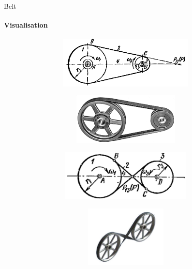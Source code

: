 \documentclass[aspectratio=169]{beamer}
\begin{document}
\begin{frame}[t]{Belt}
    \framesubtitle{Visualisation}
    \vspace{-0.5cm}
    \begin{figure}[H]
        \begin{subfigure}{0.49\textwidth}
            \centering\includegraphics[height=2.6cm,width=1\textwidth,keepaspectratio]{belt_kinematics_1.png}
            \label{fig:belt_kinematics_1.png}
        \end{subfigure}
        \begin{subfigure}{0.49\textwidth}
            \centering\includegraphics[height=2.6cm,width=1\textwidth,keepaspectratio]{belt_1.png}
            \label{fig:belt_1.png}
        \end{subfigure}

        \begin{subfigure}{0.49\textwidth}
            \centering\includegraphics[height=2.6cm,width=1\textwidth,keepaspectratio]{belt_kinematics_2.png}
            \label{fig:belt_kinematics_2.png}
        \end{subfigure}
        \begin{subfigure}{0.49\textwidth}
            \centering\includegraphics[height=3.1cm,width=1\textwidth,keepaspectratio]{belt_2.jpg}
            \label{fig:belt_2.jpg}
        \end{subfigure}
    \end{figure}
\end{frame}
\end{document}
